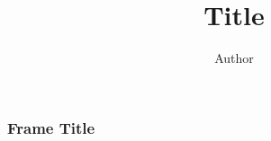\documentclass{beamer}
\title{Title}
\author{Author}
\date{}
\begin{document}
\begin{frame}
    \titlepage
\end{frame}

\begin{frame}
    \frametitle{Frame Title}
\end{frame}
\end{document}
